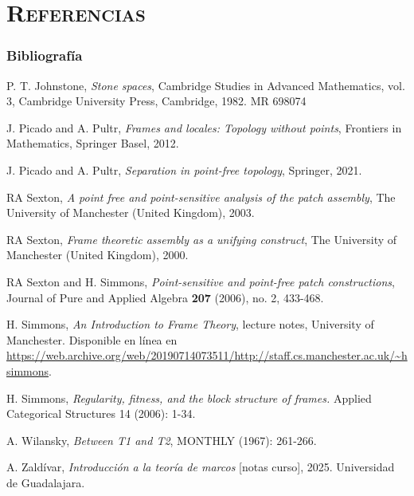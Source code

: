 \documentclass[compress,12pt]{beamer}
\begin{document}
\section*{\textsc{Referencias}}
\begin{frame}[allowframebreaks]
\frametitle{Bibliografía}
\begin{thebibliography}{20}

 P. T. Johnstone, \textit{Stone spaces}, Cambridge Studies in Advanced Mathematics, vol. 3, Cambridge University Press, Cambridge, 1982. MR 698074



 J. Picado and A. Pultr, \textit{Frames and locales: Topology without points}, Frontiers in Mathematics, Springer Basel, 2012.

 J. Picado and A. Pultr, \textit{Separation in point-free topology}, Springer, 2021.

 RA Sexton, \textit{A point free and point-sensitive analysis of the patch assembly}, The University of Manchester (United Kingdom), 2003.

 RA Sexton, \textit{Frame theoretic assembly as a unifying construct}, The University of Manchester (United Kingdom), 2000.

 RA Sexton and H. Simmons, \textit{Point-sensitive and point-free patch constructions}, Journal of Pure and Applied Algebra \textbf{207} (2006), no. 2, 433-468.

 H. Simmons, \textit{An Introduction to Frame Theory}, lecture notes, University of Manchester. Disponible en línea en \url{https://web.archive.org/web/20190714073511/http://staff.cs.manchester.ac.uk/~hsimmons}.

 H. Simmons, \textit{Regularity, fitness, and the block structure of frames.} Applied Categorical Structures 14 (2006): 1-34.



 A. Wilansky, \textit{Between T1 and T2}, MONTHLY (1967): 261-266.

 A. Zaldívar, \textit{Introducción a la teoría de marcos} [notas curso], 2025. Universidad de Guadalajara.
\end{thebibliography}
\end{frame}
\end{document}
